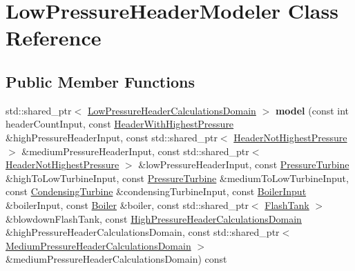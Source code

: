 \hypertarget{class_low_pressure_header_modeler}{}\section{Low\+Pressure\+Header\+Modeler Class Reference}
\label{class_low_pressure_header_modeler}
\subsection*{Public Member Functions}
\begin{DoxyCompactItemize}
\item 
\mbox{\label{class_low_pressure_header_modeler_a655bcccd2e96644381e053c08b7d1a88}} 
std\+::shared\+\_\+ptr$<$ \hyperlink{class_low_pressure_header_calculations_domain}{Low\+Pressure\+Header\+Calculations\+Domain} $>$ {\bfseries model} (const int header\+Count\+Input, const \hyperlink{class_header_with_highest_pressure}{Header\+With\+Highest\+Pressure} \&high\+Pressure\+Header\+Input, const std\+::shared\+\_\+ptr$<$ \hyperlink{class_header_not_highest_pressure}{Header\+Not\+Highest\+Pressure} $>$ \&medium\+Pressure\+Header\+Input, const std\+::shared\+\_\+ptr$<$ \hyperlink{class_header_not_highest_pressure}{Header\+Not\+Highest\+Pressure} $>$ \&low\+Pressure\+Header\+Input, const \hyperlink{class_pressure_turbine}{Pressure\+Turbine} \&high\+To\+Low\+Turbine\+Input, const \hyperlink{class_pressure_turbine}{Pressure\+Turbine} \&medium\+To\+Low\+Turbine\+Input, const \hyperlink{class_condensing_turbine}{Condensing\+Turbine} \&condensing\+Turbine\+Input, const \hyperlink{class_boiler_input}{Boiler\+Input} \&boiler\+Input, const \hyperlink{class_boiler}{Boiler} \&boiler, const std\+::shared\+\_\+ptr$<$ \hyperlink{class_flash_tank}{Flash\+Tank} $>$ \&blowdown\+Flash\+Tank, const \hyperlink{class_high_pressure_header_calculations_domain}{High\+Pressure\+Header\+Calculations\+Domain} \&high\+Pressure\+Header\+Calculations\+Domain, const std\+::shared\+\_\+ptr$<$ \hyperlink{class_medium_pressure_header_calculations_domain}{Medium\+Pressure\+Header\+Calculations\+Domain} $>$ \&medium\+Pressure\+Header\+Calculations\+Domain) const
\item 
\mbox{\label{class_low_pressure_header_modeler_ab3f2f01bdacfb2527df2f085264372d7}} 

\end{DoxyCompactItemize}

